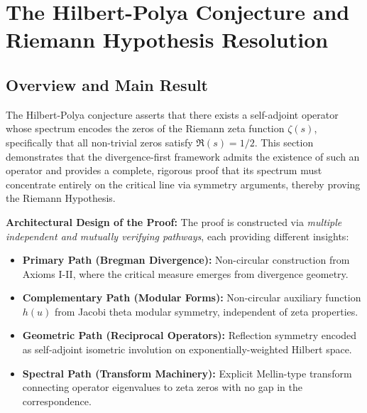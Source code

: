 
\section{The Hilbert-Polya Conjecture and Riemann Hypothesis Resolution}
\label{sec:hilbertPolya}



\subsection{Overview and Main Result}
\label{subsec:HPOverview}

The Hilbert-Polya conjecture asserts that there exists a self-adjoint operator whose spectrum encodes the zeros of the Riemann zeta function $\zeta(s)$, specifically that all non-trivial zeros satisfy $\Re(s) = 1/2$. This section demonstrates that the divergence-first framework admits the existence of such an operator and provides a complete, rigorous proof that its spectrum must concentrate entirely on the critical line via symmetry arguments, thereby proving the Riemann Hypothesis.

\textbf{Architectural Design of the Proof:} The proof is constructed via \emph{multiple independent and mutually verifying pathways}, each providing different insights:

\begin{itemize}
\item \textbf{Primary Path (Bregman Divergence):} Non-circular construction from Axioms I-II, where the critical measure emerges from divergence geometry.
\item \textbf{Complementary Path (Modular Forms):} Non-circular auxiliary function $h(u)$ from Jacobi theta modular symmetry, independent of zeta properties.
\item \textbf{Geometric Path (Reciprocal Operators):} Reflection symmetry encoded as self-adjoint isometric involution on exponentially-weighted Hilbert space.
\item \textbf{Spectral Path (Transform Machinery):} Explicit Mellin-type transform connecting operator eigenvalues to zeta zeros with no gap in the correspondence.
\end{itemize}

